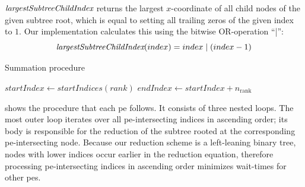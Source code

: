 $\textit{largestSubtreeChildIndex}$ returns the largest $x$-coordinate of all child nodes of the given subtree root, which is equal to setting all trailing zeros of the given index to $1$.
Our implementation calculates this using the bitwise OR-operation \enquote{|}:
\begin{equation}
\label{eq:LargestChildIndex}
\textit{largestSubtreeChildIndex}(index) = index \;|\; (index - 1)
\end{equation}

\begin{algorithm}
\caption{Summation procedure}\label{algo:SummationAlgo}
\DontPrintSemicolon
\SetAlgoLined
$startIndex \gets startIndices (rank)$\;
$endIndex \gets startIndex + n_{\textrm{rank}}$\;
\Else{
	$outboundSubtreeRoots \gets \rankIntersectingIndices ([\textit{startIndex}, \textit{endIndex}))$\;
}
\end{algorithm}

\newpage
{} shows the procedure that each \gls{pe} follows.
It consists of three nested loops.
The most outer loop iterates over all \gls{pe}-intersecting indices in ascending order; its body is responsible for the reduction of the subtree rooted at the corresponding \gls{pe}-intersecting node.
Because our reduction scheme is a left-leaning binary tree, nodes with lower indices occur earlier in the reduction equation, therefore processing \gls{pe}-intersecting indices in ascending order minimizes wait-times for other \glspl{pe}.


